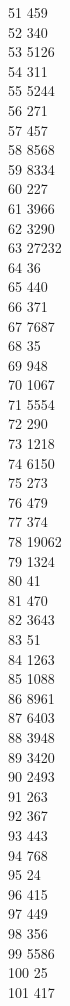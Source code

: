 { 51	459 \\
 52	340 \\
 53	5126 \\
 54	311 \\
 55	5244 \\
 56	271 \\
 57	457 \\
 58	8568 \\
 59	8334 \\
 60	227 \\
 61	3966 \\
 62	3290 \\
 63	27232 \\
 64	36 \\
 65	440 \\
 66	371 \\
 67	7687 \\
 68	35 \\
 69	948 \\
 70	1067 \\
 71	5554 \\
 72	290 \\
 73	1218 \\
 74	6150 \\
 75	273 \\
 76	479 \\
 77	374 \\
 78	19062 \\
 79	1324 \\
 80	41 \\
 81	470 \\
 82	3643 \\
 83	51 \\
 84	1263 \\
 85	1088 \\
 86	8961 \\
 87	6403 \\
 88	3948 \\
 89	3420 \\
 90	2493 \\
 91	263 \\
 92	367 \\
 93	443 \\
 94	768 \\
 95	24 \\
 96	415 \\
 97	449 \\
 98	356 \\
 99	5586 \\
 100	25 \\
 101	417 \\
}
